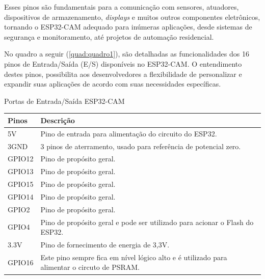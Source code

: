 Esses pinos são fundamentais para a comunicação com sensores, atuadores,
dispositivos de armazenamento, \textit{displays} e muitos outros componentes
eletrônicos, tornando o ESP32-CAM
adequado para inúmeras aplicações, desde sistemas de
segurança e monitoramento, até projetos de automação residencial.

No quadro a seguir (\autoref{quad:quadro1}), são detalhadas as funcionalidades dos 16 pinos 
de Entrada/Saída (E/S) disponíveis no ESP32-CAM. O entendimento destes pinos, possibilita 
aos desenvolvedores a flexibilidade de personalizar e expandir suas 
aplicações de acordo com suas necessidades específicas.

\begin{tabframed}[htb]
    \caption{Portas de Entrada/Saída ESP32-CAM}
    \label{quad:quadro1}
    \begin{tabular}{|l|l|}
        \hline
        \textbf{Pinos} & \textbf{Descrição}                                                                          \\ \hline
        5V             & Pino de entrada para alimentação do circuito do ESP32.                                      \\ \hline
        3GND           & 3 pinos de aterramento, usado para referência de potencial zero.                          \\ \hline
        GPIO12         & Pino de propósito geral.                                                                    \\ \hline
        GPIO13         & Pino de propósito geral.                                                                    \\ \hline
        GPIO15         & Pino de propósito geral.                                                                    \\ \hline
        GPIO14         & Pino de propósito geral.                                                                    \\ \hline
        GPIO2          & Pino de propósito geral.                                                                    \\ \hline
        GPIO4          & Pino de propósito geral e pode ser utilizado para acionar o Flash do ESP32.                 \\ \hline
        3.3V           & Pino de fornecimento de energia de 3,3V.                                                    \\ \hline
        GPIO16         & Este pino sempre fica em nível lógico alto e é utilizado para alimentar o circuto de PSRAM. \\ \hline

\end{tabular}
\end{tabframed}
